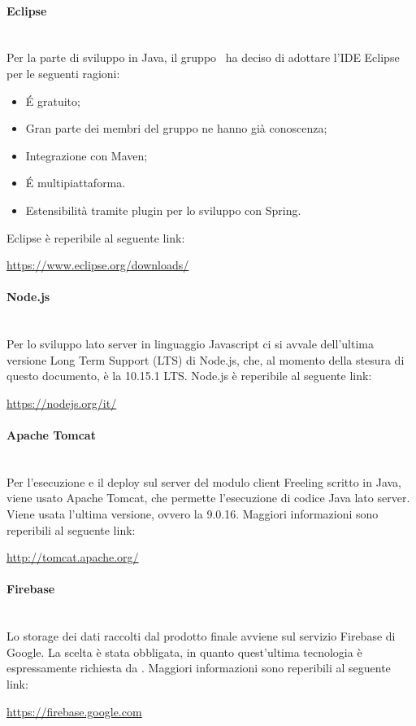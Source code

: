 \paragraph{Eclipse}\mbox{}\\
Per la parte di sviluppo in Java, il gruppo \gruppo \ ha deciso di adottare l'IDE Eclipse per le seguenti ragioni:
\begin{itemize}
	\item \'E gratuito;
	\item Gran parte dei membri del gruppo ne hanno già conoscenza;
	\item Integrazione con Maven;
	\item \'E multipiattaforma.
	\item Estensibilità tramite plugin per lo sviluppo con Spring.
\end{itemize}
Eclipse è reperibile al seguente link:\newline
\begin{center}
	\url{https://www.eclipse.org/downloads/}
\end{center}

\paragraph{Node.js}\mbox{}\\
Per lo sviluppo lato server in linguaggio Javascript ci si avvale dell'ultima versione Long Term Support (LTS) di Node.js, che, al momento della stesura di questo documento, è la 10.15.1 LTS.
Node.js è reperibile al seguente link:\newline
\begin{center}
	\url{https://nodejs.org/it/}
\end{center}

\paragraph{Apache Tomcat}\mbox{}\\
Per l'esecuzione e il deploy sul server del modulo client Freeling scritto in Java, viene usato Apache Tomcat, che permette l'esecuzione di codice Java lato server. Viene usata l'ultima versione, ovvero la 9.0.16.
Maggiori informazioni sono reperibili al seguente link:\newline
\begin{center}
	\url{http://tomcat.apache.org/}
\end{center}

\paragraph{Firebase}\mbox{}\\
Lo storage dei dati raccolti dal prodotto finale avviene sul servizio Firebase di Google. La scelta è stata obbligata, in quanto quest'ultima tecnologia è espressamente richiesta da \proponente .\newline
Maggiori informazioni sono reperibili al seguente link:\newline
\begin{center}
	\url{https://firebase.google.com}
\end{center}


